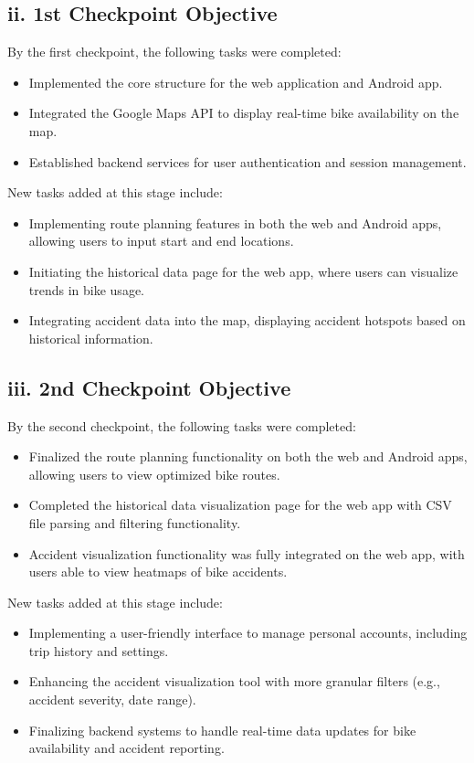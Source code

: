 \documentclass[12pt]{article}
\begin{document}
\subsection*{ii. 1st Checkpoint Objective}
By the first checkpoint, the following tasks were completed:
\begin{itemize}
    \item Implemented the core structure for the web application and Android app.
    \item Integrated the Google Maps API to display real-time bike availability on the map.
    \item Established backend services for user authentication and session management.
\end{itemize}
New tasks added at this stage include:
\begin{itemize}
    \item Implementing route planning features in both the web and Android apps, allowing users to input start and end locations.
    \item Initiating the historical data page for the web app, where users can visualize trends in bike usage.
    \item Integrating accident data into the map, displaying accident hotspots based on historical information.
\end{itemize}

\subsection*{iii. 2nd Checkpoint Objective}
By the second checkpoint, the following tasks were completed:
\begin{itemize}
    \item Finalized the route planning functionality on both the web and Android apps, allowing users to view optimized bike routes.
    \item Completed the historical data visualization page for the web app with CSV file parsing and filtering functionality.
    \item Accident visualization functionality was fully integrated on the web app, with users able to view heatmaps of bike accidents.
\end{itemize}
New tasks added at this stage include:
\begin{itemize}
    \item Implementing a user-friendly interface to manage personal accounts, including trip history and settings.
    \item Enhancing the accident visualization tool with more granular filters (e.g., accident severity, date range).
    \item Finalizing backend systems to handle real-time data updates for bike availability and accident reporting.
\end{itemize}
\end{document}
